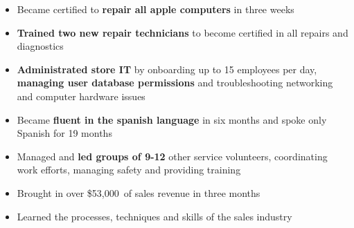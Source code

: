 	\divider

	\begin{itemize}
        \item Became certified to \textbf{repair all apple computers} in three weeks
			\smallskip
        \item \textbf{Trained two new repair technicians} to become certified in all repairs
			and diagnostics
			\smallskip
        \item \textbf{Administrated store IT} by onboarding up to 15 employees per day, \textbf{managing user database permissions} and troubleshooting networking and computer hardware issues
	\end{itemize}
	
	\divider

	\begin{itemize}
        \item Became \textbf{fluent in the spanish language} in six months and spoke
			only Spanish for 19 months
			\smallskip
        \item Managed and \textbf{led groups of 9-12} other service volunteers, coordinating work
			efforts, managing safety and providing training
	\end{itemize}

	\divider

	\begin{itemize}
		\item Brought in over \$53,000\ of sales revenue in three months
			\smallskip
		\item Learned the processes, techniques and skills of the sales industry
	\end{itemize}




